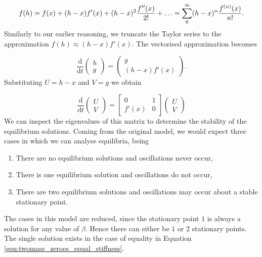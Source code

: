 \documentclass{article}
\begin{document}
\begin{equation}
    f(h) = f(x) + (h-x)f'(x) + (h-x)^2\frac{f''(x)}{2!} + \mathellipsis =\sum_{0}^{\infty} (h-x)^n\frac{f^{(n)}(x)}{n!}.
\end{equation}
Similarly to our earlier reasoning, we truncate the Taylor series to the approximation $f(h) \approx (h-x)f'(x)$.
The vectorised approximation becomes

\begin{equation}
    \frac{\mathrm{d}}{\mathrm{d}t}\begin{pmatrix}
        h \\
        g
    \end{pmatrix} = \begin{pmatrix}
        g \\
        (h-x)f'(x)
    \end{pmatrix}.
\end{equation}
Substituting \(U = h-x\) and \(V = g\) we obtain

\begin{equation}
    \frac{\mathrm{d}}{\mathrm{d}t} \begin{pmatrix}
        U \\
        V
    \end{pmatrix} = \begin{bmatrix}
        0 & 1 \\
        f'(x) & 0
    \end{bmatrix} \begin{pmatrix}
        U \\
        V
    \end{pmatrix} 
\end{equation}
We can inspect the eigenvalues of this matrix to determine the stability of the equilibrium solutions. %
Coming from the original model, we would expect three cases in which we can analyse equilibria, being

\begin{enumerate}
    \item There are no equilibrium solutions and oscillations never occur,
    \item There is one equilibrium solution and oscillations do not occur,
    \item There are two equilibrium solutions and oscillations may occur about a stable stationary point.
\end{enumerate} %

The cases in this model are reduced, since the stationary point $1$ is always a solution for any value of \(\beta\).
Hence there can either be $1$ or $2$ stationary points.
The single solution exists in the case of equality in Equation \ref{eqn:twomass_zeroes_equal_stiffness}.
\end{document}
